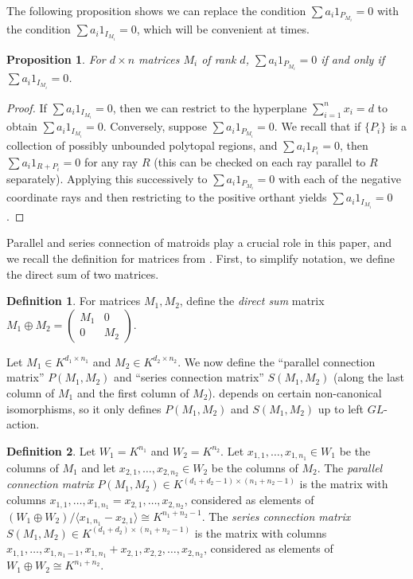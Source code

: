 \documentclass[12pt]{amsart}
\theoremstyle{plain}
\newtheorem{Prop}[Thm]{Proposition}
\theoremstyle{definition}
\newtheorem{Def}{Definition}[section]
\theoremstyle{remark}
\begin{document}
The following proposition shows we can replace the condition $\sum a_i1_{P_{M_i}}=0$ with the condition $\sum a_i1_{I_{M_i}}=0$, which will be convenient at times.

\begin{Prop}\label{rankind}
For $d\times n$ matrices $M_i$ of rank $d$, $\sum a_i1_{P_{M_i}}=0$ if and only if $\sum a_i1_{I_{M_i}}=0$.
\end{Prop}
\begin{proof}
If $\sum a_i1_{I_{M_i}}=0$, then we can restrict to the hyperplane $\sum_{i=1}^n x_i=d$ to obtain $\sum a_i1_{I_{M_i}}=0$. Conversely, suppose $\sum a_i1_{P_{M_i}}=0$. We recall that if $\{P_i\}$ is a collection of possibly unbounded polytopal regions, and $\sum a_i 1_{P_i}=0$, then $\sum a_i 1_{R+P_i}=0$ for any ray $R$ (this can be checked on each ray parallel to $R$ separately). Applying this successively to $\sum a_i 1_{P_{M_i}}=0$ with each of the negative coordinate rays and then restricting to the positive orthant yields $\sum a_i 1_{I_{M_i}}=0$.
\end{proof}

Parallel and series connection of matroids play a crucial role in this paper, and we recall the definition for matrices from \cite[page 262, Figure 7.6(b)]{Oxley}. First, to simplify notation, we define the direct sum of two matrices.

\begin{Def}
For matrices $M_1,M_2$, define the \emph{direct sum} matrix $M_1\oplus M_2=\begin{pmatrix} M_1 & 0 \\ 0 & M_2\end{pmatrix}$.
\end{Def}

Let $M_1 \in K^{d_1\times n_1}$ and $M_2 \in K^{d_2 \times n_2}$. We now define the ``parallel connection matrix'' $P(M_1, M_2)$ and ``series connection matrix'' $S(M_1, M_2)$ (along the last column of $M_1$ and the first column of $M_2$).  depends on certain non-canonical isomorphisms, so it only defines $P(M_1, M_2)$ and $S(M_1, M_2)$ up to left $GL$-action.

\begin{Def}
\label{serpardefn}
Let $W_1 = K^{n_1}$ and $W_2 = K^{n_2}$. Let $x_{1, 1}, \ldots, x_{1, n_1} \in W_1$ be the columns of $M_1$ and let $x_{2, 1}, \ldots, x_{2, n_2} \in W_2$ be the columns of $M_2$. The \emph{parallel connection matrix} $P(M_1, M_2) \in K^{(d_1 + d_2 - 1) \times (n_1 + n_2 - 1)}$ is the matrix with columns $x_{1, 1}, \ldots, x_{1, n_1} = x_{2, 1}, \ldots, x_{2, n_2}$, considered as elements of $(W_1 \oplus W_2) / \langle x_{1, n_1} - x_{2, 1}\rangle \cong K^{n_1 + n_2 - 1}$. The \emph{series connection matrix} $S(M_1, M_2) \in K^{(d_1 + d_2) \times (n_1 + n_2 - 1)}$ is the matrix with columns $x_{1, 1}, \ldots, x_{1, n_1 - 1}, x_{1, n_1} + x_{2, 1}, x_{2, 2}, \ldots, x_{2, n_2}$, considered as elements of $W_1 \oplus W_2 \cong K^{n_1 + n_2}$.
\end{Def}
\end{document}
